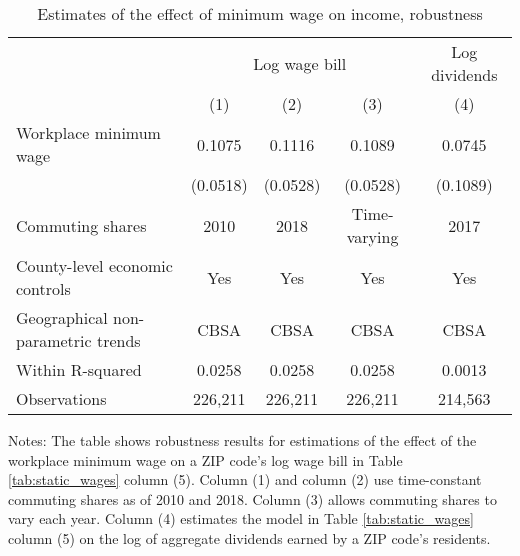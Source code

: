 \begin{table}[]
    \caption{Estimates of the effect of minimum wage on income, robustness}
    \label{tab:static_wages_robustness}

    \begin{tabular}{@{}lcccc@{}}
        \toprule
                                        & \multicolumn{3}{c}{Log wage bill} & Log dividends      \\ \cmidrule(l){2-5} 
                                        & (1)       & (2)      & (3)          & (4)              \\ \midrule
        Workplace minimum wage             & 0.1075   & 0.1116    & 0.1089       & 0.0745            \\
                                        & (0.0518) & (0.0528)  & (0.0528)     & (0.1089)          \\ \midrule
        Commuting shares                   & 2010     & 2018      & Time-varying & 2017              \\
        County-level economic controls     & Yes      & Yes       & Yes          & Yes               \\
        Geographical non-parametric trends & CBSA     & CBSA      & CBSA         & CBSA              \\
        Within R-squared                   & 0.0258   & 0.0258    & 0.0258        & 0.0013              \\
        Observations                       & 226,211  & 226,211   & 226,211       & 214,563              \\ \bottomrule
    \end{tabular}
    
    \begin{minipage}{.95\textwidth} \footnotesize
        \vspace{2mm}
        Notes: The table shows robustness results for estimations of the effect of the workplace
        minimum wage on a ZIP code's log wage bill in Table \ref{tab:static_wages} column (5).
        Column (1) and column (2) use time-constant commuting shares as of 2010 and 2018.
        Column (3) allows commuting shares to vary each year.
        Column (4) estimates the model in Table \ref{tab:static_wages} column (5) on the log
        of aggregate dividends earned by a ZIP code's residents.
    \end{minipage}
\end{table}
